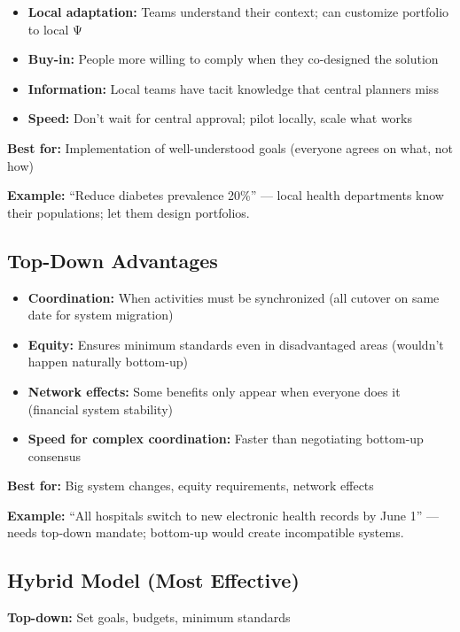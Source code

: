 \begin{itemize}
\item \textbf{Local adaptation:} Teams understand their context; can customize portfolio to local Ψ
\item \textbf{Buy-in:} People more willing to comply when they co-designed the solution
\item \textbf{Information:} Local teams have tacit knowledge that central planners miss
\item \textbf{Speed:} Don't wait for central approval; pilot locally, scale what works
\end{itemize}

\textbf{Best for:} Implementation of well-understood goals (everyone agrees on what, not how)

\textbf{Example:} ``Reduce diabetes prevalence 20\%'' — local health departments know their populations; let them design portfolios.

\subsection{Top-Down Advantages}

\begin{itemize}
\item \textbf{Coordination:} When activities must be synchronized (all cutover on same date for system migration)
\item \textbf{Equity:} Ensures minimum standards even in disadvantaged areas (wouldn't happen naturally bottom-up)
\item \textbf{Network effects:} Some benefits only appear when everyone does it (financial system stability)
\item \textbf{Speed for complex coordination:} Faster than negotiating bottom-up consensus
\end{itemize}

\textbf{Best for:} Big system changes, equity requirements, network effects

\textbf{Example:} ``All hospitals switch to new electronic health records by June 1'' — needs top-down mandate; bottom-up would create incompatible systems.

\subsection{Hybrid Model (Most Effective)}

\textbf{Top-down:} Set goals, budgets, minimum standards

